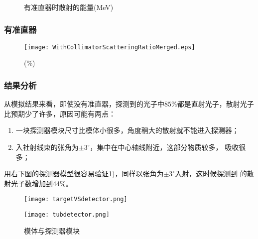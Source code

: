 \documentclass{beamer}
\begin{document}
\begin{CJK*}{UTF8}{gkai}
\begin{frame}
\begin{figure}[ht]
      \caption{\liuhao 有准直器时散射的能量(MeV)}
    \end{figure}
  \end{frame}
  \begin{frame}\frametitle{有准直器}
    \begin{figure}[ht]
      \centering
      \texttt{[image: WithCollimatorScatteringRatioMerged.eps]}
      \caption{(\%)}
    \end{figure}
  \end{frame}
  \begin{frame}\frametitle{结果分析}
    \begin{minipage}[t]{0.4\textwidth}
      \liuhao
      从模拟结果来看，即使没有准直器，探测到的光子中$85\%$都是直射光子，散射光子
      比预期少了许多，原因可能有两点：
      \begin{enumerate}[1)]
	\item 一块探测器模块尺寸比模体小很多，角度稍大的散射就不能进入探测器；
	\item 入社射线束的张角为$\pm3^\circ$，集中在中心轴线附近，这部分物质较多，
	  吸收很多；
      \end{enumerate}
      用右下图的探测器模型很容易验证1)，同样以张角为$\pm3^\circ$入射，这时候探测到
      的散射光子数增加到44\%。
    \end{minipage}
    \begin{minipage}[t]{0.58\textwidth}
      \begin{figure}[ht]
	\centering
	\texttt{[image: targetVSdetector.png]}

	\texttt{[image: tubdetector.png]}
	\caption{\liuhao 模体与探测器模块}
      \end{figure}
    \end{minipage}
  \end{frame}
  \ThankYouPage
\end{CJK*}
\end{document}
